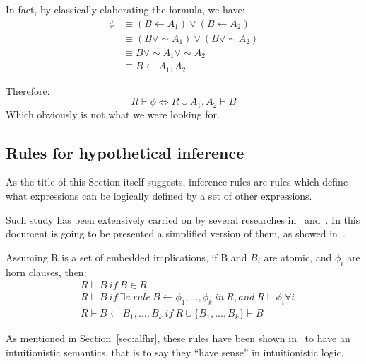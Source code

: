 In fact, by classically elaborating the formula, we have:
\begin{equation}
  \begin{split}
  \phi &\equiv (B \leftarrow A_1) \lor (B \leftarrow A_2)\\
  &\equiv (B \lor \sim A_1) \lor (B \lor \sim A_2)\\
  &\equiv B \lor \sim A_1 \lor \sim A_2 \\
  &\equiv B \leftarrow A_1, A_2
  \end{split}
\end{equation}

Therefore:
\begin{equation}
  R \vdash \phi \iff R \cup {A_1, A_2} \vdash B
\end{equation}
Which obviously is not what we were looking for.

\subsection{Rules for hypothetical inference}
\label{sec:rfhi}
As the title of this Section itself suggests, inference rules are rules
which define what expressions can be logically defined by a set of other expressions.

Such study has been extensively carried on by several researches
in~\cite{Gabbay1984319}\cite{Miller:1989:LAM:65822.65826} and~\cite{McCarty:1988:CIL:49484.49485}.
In this document is going to be presented a simplified
version of them, as showed in~\cite{Bonner88alogic}.

Assuming R is a set of embedded implications, if B and $B_i$ are atomic, and $\phi_i$
are horn clauses, then:
\begin{equation}
  \begin{split}
    &R \vdash B\ if\ B \in R \\
    &R \vdash B\ if\ \exists a\ rule\ B \leftarrow \phi_1,...,\phi_k\ in\ R, and\ R \vdash \phi_i \forall i\\
    &R \vdash B \leftarrow B_1,..., B_k\ if\ R \cup \{B_1,...,B_k\} \vdash B
  \end{split}
\end{equation}


As mentioned in Section~\ref{sec:alfhr}, these rules have been shown in~\cite{Bonner88alogic}
to have an intuitionistic semantics, that is to say they ``have sense'' in intuitionistic logic.
